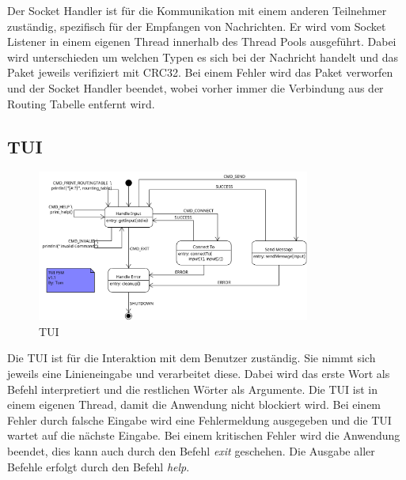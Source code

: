 Der Socket Handler ist für die Kommunikation mit einem anderen Teilnehmer zuständig, spezifisch für der Empfangen von Nachrichten.
Er wird vom Socket Listener in einem eigenen Thread innerhalb des Thread Pools ausgeführt. 
Dabei wird unterschieden um welchen Typen es sich bei der Nachricht handelt und das Paket jeweils verifiziert mit CRC32.
Bei einem Fehler wird das Paket verworfen und der Socket Handler beendet,
 wobei vorher immer die Verbindung aus der Routing Tabelle entfernt wird.

 \subsection{TUI}

\begin{figure}[H]
\centering
\includegraphics[width=0.8\textwidth]{images/tui.png}
\caption{TUI}
\label{fig:TUI}
\end{figure}

Die TUI ist für die Interaktion mit dem Benutzer zuständig. Sie nimmt sich jeweils eine Linieneingabe und verarbeitet diese.
Dabei wird das erste Wort als Befehl interpretiert und die restlichen Wörter als Argumente.
Die TUI ist in einem eigenen Thread, damit die Anwendung nicht blockiert wird.
Bei einem Fehler durch falsche Eingabe wird eine Fehlermeldung ausgegeben und die TUI wartet auf die nächste Eingabe.
Bei einem kritischen Fehler wird die Anwendung beendet, dies kann auch durch den Befehl \textit{exit} geschehen.
Die Ausgabe aller Befehle erfolgt durch den Befehl \textit{help}.

\newpage
